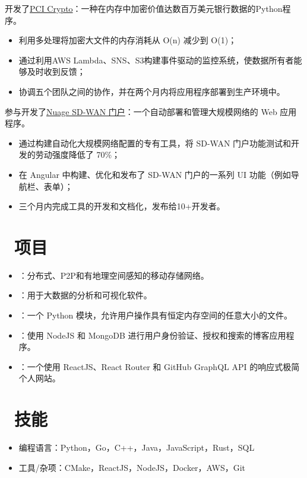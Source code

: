 \documentclass{resume}
\begin{document}
开发了\underline{PCI Crypto}：一种在内存中加密价值达数百万美元银行数据的Python程序。
\begin{itemize}
  \item {利用多处理将加密大文件的内存消耗从 O(n) 减少到 O(1)；}
  \item {通过利用AWS Lambda、SNS、S3构建事件驱动的监控系统，使数据所有者能够及时收到反馈；}
  \item {协调五个团队之间的协作，并在两个月内将应用程序部署到生产环境中。}
\end{itemize}

参与开发了\underline{Nuage SD-WAN 门户}：一个自动部署和管理大规模网络的 Web 应用程序。
\begin{itemize}
  \item {通过构建自动化大规模网络配置的专有工具，将 SD-WAN 门户功能测试和开发的劳动强度降低了 70\%；}
  \item {在 Angular 中构建、优化和发布了 SD-WAN 门户的一系列 UI 功能（例如导航栏、表单）；}
  \item {三个月内完成工具的开发和文档化，发布给10+开发者。}
\end{itemize}

\section{\faCodeFork\ 项目}
\begin{itemize}[parsep=0.5ex]
  \item {}：分布式、P2P和有地理空间感知的移动存储网络。
  \item {}：用于大数据的分析和可视化软件。
  \item {}：一个 Python 模块，允许用户操作具有恒定内存空间的任意大小的文件。
  \item {}：使用 NodeJS 和 MongoDB 进行用户身份验证、授权和搜索的博客应用程序。
  \item {}：一个使用 ReactJS、React Router 和 GitHub GraphQL API 的响应式极简个人网站。
\end{itemize}

\section{\faCogs\ 技能}
\begin{itemize}[parsep=0.5ex]
  \item 编程语言：Python，Go，C++，Java，JavaScript，Rust，SQL
  \item 工具/杂项：CMake，ReactJS，NodeJS，Docker，AWS，Git
\end{itemize}

%
%
\end{document}
